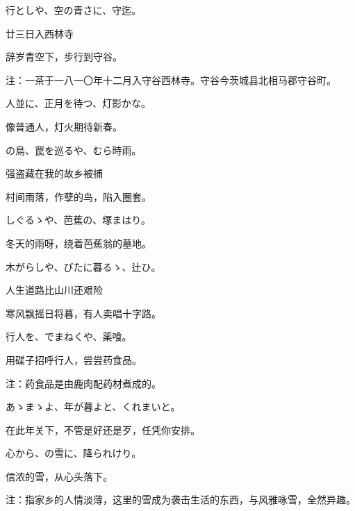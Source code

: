 \begin{haiku}
    {\FH 行としや、空の青さに、守迄。}

    {\FK 廿三日入西林寺}

    {\FK 辞岁青空下，步行到守谷。}

    {\FT 注：一茶于一八一〇年十二月入守谷西林寺。守谷今茨城县北相马郡守谷町。}
\end{haiku}

\begin{haiku}
    {\FH 人並に、正月を待つ、灯影かな。}

    {\FK 像普通人，灯火期待新春。}
\end{haiku}

\begin{haiku}
    {\FH {}の鳥、罠を巡るや、むら時雨。}

    {\FK 强盗藏在我的故乡被捕}

    {\FK 村间雨落，作孽的鸟，陷入圈套。}
\end{haiku}

\begin{haiku}
    {\FH しぐるゝや、芭蕉の、塚まはり。}

    {\FK 冬天的雨呀，绕着芭蕉翁的墓地。}
\end{haiku}

\begin{haiku}
    {\FH 木がらしや、びたに暮るゝ、辻ひ。}

    {\FK 人生道路比山川还艰险}

    {\FK 寒风飘摇日将暮，有人卖唱十字路。}
\end{haiku}

\begin{haiku}
    {\FH 行人を、でまねくや、薬喰。}

    {\FK 用碟子招呼行人，尝尝药食品。}

    {\FT 注：药食品是由鹿肉配药材煮成的。}
\end{haiku}

\begin{haiku}
    {\FH あゝまゝよ、年が暮よと、くれまいと。}

    {\FK 在此年关下，不管是好还是歹，任凭你安排。}
\end{haiku}

\begin{haiku}
    {\FH 心から、の雪に、降られけり。}

    {\FK 信浓的雪，从心头落下。}

    {\FT 注：指家乡的人情淡薄，这里的雪成为袭击生活的东西，与风雅咏雪，全然异趣。}
\end{haiku}

